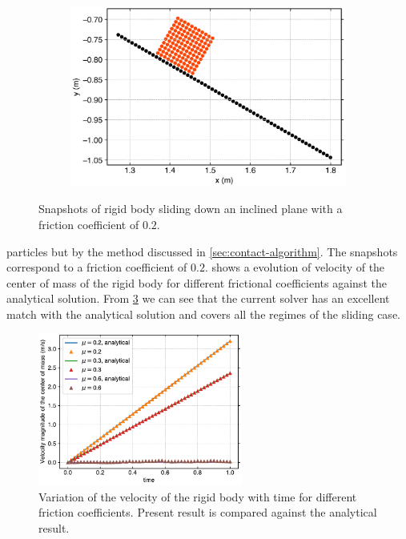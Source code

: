 \begin{figure}[!htpb]
  \begin{subfigure}{0.48\textwidth}
    \centering
    \includegraphics[width=1.0\textwidth]{figures/rfc/figures/mohseni_2021_free_sliding_on_a_slope_2d/fric_coeff_0_2/time2}
    \label{fig:passing-2}
  \end{subfigure}
  \caption{Snapshots of rigid body sliding down an inclined plane with a
    friction coefficient of $0.2$.}
\label{fig:mohseni-2021-sliding-2d}
\end{figure}
particles but by the method discussed in \cref{sec:contact-algorithm}. The
snapshots correspond to a friction coefficient of $0.2$.
 shows a evolution of
velocity of the center of mass of the rigid body for different frictional
coefficients against the analytical solution. From
\cref{fig:results-solid-sliding-velocity-vs-time-2d} we can see that the current
solver has an excellent match with the analytical solution and covers all the
regimes of the sliding case.
\begin{figure}[!htpb]
  \centering
  \includegraphics[width=0.6\textwidth]{figures/rfc/figures/mohseni_2021_free_sliding_on_a_slope_2d/velocity_vs_time}
  \caption{Variation of the velocity of the rigid body with time for different
    friction coefficients. Present result is compared against the analytical
    result.}
\label{fig:results-solid-sliding-velocity-vs-time-2d}
\end{figure}

